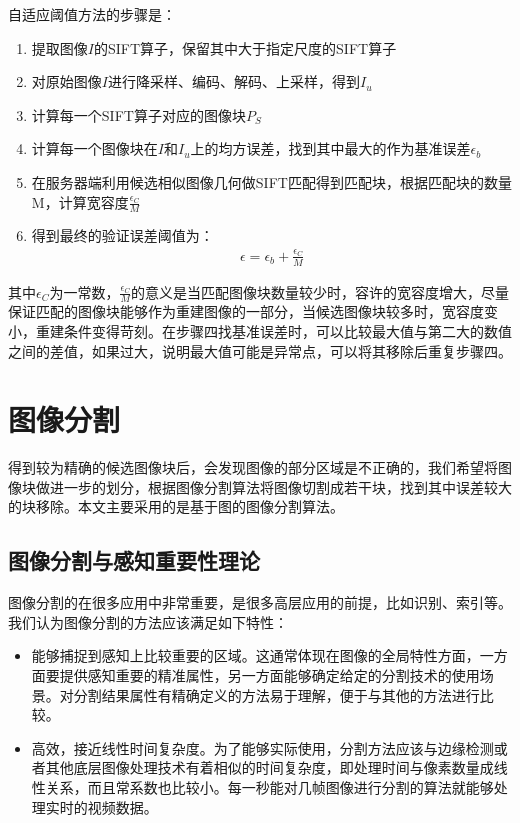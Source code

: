 自适应阈值方法的步骤是：
\begin{enumerate}
\item 提取图像\(I\)的SIFT算子，保留其中大于指定尺度的SIFT算子
\item 对原始图像\(I\)进行降采样、编码、解码、上采样，得到\(I_u\)
\item 计算每一个SIFT算子对应的图像块\(P_S\)
\item 计算每一个图像块在\(I\)和\(I_u\)上的均方误差，找到其中最大的作为基准误差\(\epsilon_b\)
\item 在服务器端利用候选相似图像几何做SIFT匹配得到匹配块，根据匹配块的数量M，计算宽容度\(\frac{\epsilon_C}{M}\)
\item 得到最终的验证误差阈值为：
\begin{align}
\epsilon = \epsilon_b + \frac{\epsilon_C}{M}
\end{align}
\end{enumerate}

其中\(\epsilon_C\)为一常数，\(\frac{\epsilon_C}{M}\)的意义是当匹配图像块数量较少时，容许的宽容度增大，尽量保证匹配的图像块能够作为重建图像的一部分，当候选图像块较多时，宽容度变小，重建条件变得苛刻。在步骤四找基准误差时，可以比较最大值与第二大的数值之间的差值，如果过大，说明最大值可能是异常点，可以将其移除后重复步骤四。

\section{图像分割}

得到较为精确的候选图像块后，会发现图像的部分区域是不正确的，我们希望将图像块做进一步的划分，根据图像分割算法将图像切割成若干块，找到其中误差较大的块移除。本文主要采用的是基于图的图像分割算法\cite{Felzenszwalb:2004il}。

\subsection{图像分割与感知重要性理论}

图像分割的在很多应用中非常重要，是很多高层应用的前提，比如识别、索引等。我们认为图像分割的方法应该满足如下特性：
\begin{itemize}
\item 能够捕捉到感知上比较重要的区域。这通常体现在图像的全局特性方面，一方面要提供感知重要的精准属性，另一方面能够确定给定的分割技术的使用场景。对分割结果属性有精确定义的方法易于理解，便于与其他的方法进行比较。
\item 高效，接近线性时间复杂度。为了能够实际使用，分割方法应该与边缘检测或者其他底层图像处理技术有着相似的时间复杂度，即处理时间与像素数量成线性关系，而且常系数也比较小。每一秒能对几帧图像进行分割的算法就能够处理实时的视频数据。
\end{itemize}

